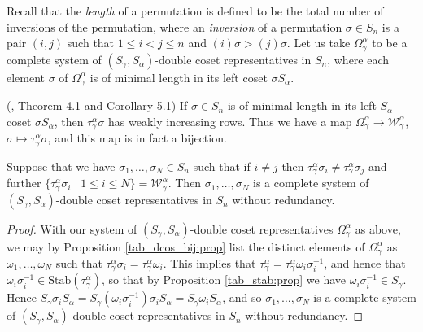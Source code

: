 Recall that the \textit{length} of a permutation is defined to be the total number of inversions of the permutation, where an
\textit{inversion} of a permutation $\sigma \in S_n$ is a pair $(i,j)$ such that $1 \leq i < j \leq n$ and $(i)\sigma > (j)\sigma$.
Let us take $\Omega^\alpha_{\gamma}$ to be a complete system of $(S_\gamma,S_\alpha)$-double coset representatives in $S_n$, where each element
$\sigma$ of $\Omega^\alpha_\gamma$ is of minimal length in its left coset $\sigma S_\alpha$.

\begin{prop}\label{tab_dcos_bij:prop}\textup{(}\cite{WLDDCR}, Theorem 4.1 and Corollary 5.1\textup{)}
If $\sigma \in S_n$ is of minimal length in its left $S_\alpha$-coset $\sigma S_\alpha$, then $\tau^\alpha_{\gamma}\sigma$ has
weakly increasing rows. Thus we have a map
$\Omega^\alpha_\gamma \longrightarrow \mathcal{W}^\alpha_\gamma$, $\sigma \longmapsto \tau^\alpha_\gamma\sigma$, and this map is in fact a
bijection.
\end{prop}

\begin{coro}\label{tabs_give_cosets:cor}
Suppose that we have $\sigma_1,\ldots,\sigma_N \in S_n$ such that if $i \neq j$ then
$\tau^\alpha_\gamma\sigma_i \neq \tau^\alpha_\gamma\sigma_j$ and further $\{\tau^\alpha_\gamma\sigma_i \mid 1 \leqslant i \leqslant N\} =
\mathcal{W}^\alpha_\gamma$. Then $\sigma_1,\ldots,\sigma_N$ is a complete system of $(S_\gamma,S_\alpha)$-double coset representatives in
$S_n$ without redundancy.
\end{coro}
\begin{proof}
With our system of $(S_\gamma,S_\alpha)$-double coset representatives $\Omega^\alpha_{\gamma}$ as above, we may by Proposition
\ref{tab_dcos_bij:prop} list the distinct elements of $\Omega^\alpha_{\gamma}$ as $\omega_1,\ldots,\omega_N$ such that
$\tau^\alpha_\gamma\sigma_i = \tau^\alpha_\gamma\omega_i$. This implies that $\tau^\alpha_\gamma = \tau^\alpha_\gamma\omega_i\sigma_i^{-1}$, and
hence that $\omega_i\sigma_i^{-1} \in \mathrm{Stab}(\tau^\alpha_\gamma)$, so that by Proposition \ref{tab_stab:prop} we have
$\omega_i\sigma_i^{-1} \in S_\gamma$. Hence $S_\gamma \sigma_i S_\alpha = S_\gamma (\omega_i\sigma_i^{-1}) \sigma_i S_\alpha =
S_\gamma \omega_i S_\alpha$, and so $\sigma_1,\ldots,\sigma_N$ is a complete system of $(S_\gamma,S_\alpha)$-double coset representatives in
$S_n$ without redundancy.
\end{proof}

